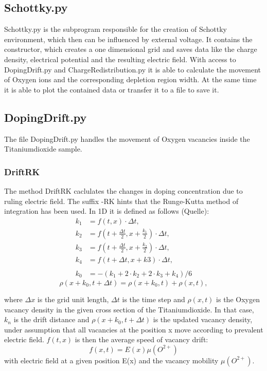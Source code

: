 \documentclass[12pt]{article}
\begin{document}
	\subsection{Schottky.py}
	Schottky.py is the subprogram responsible for the creation of Schottky environment, which then can be influenced by external voltage.
	It contains the constructor, which creates a one dimensional grid and saves data like the charge density, electrical potential and the resulting electric field. With access to DopingDrift.py and ChargeRedistribution.py it is able to calculate the movement of Oxygen ions and the corresponding depletion region width. At the same time it is able to plot the contained data or transfer it to a file to save it.

	\subsection{DopingDrift.py}
	The file DopingDrift.py handles the movement of Oxygen vacancies inside the Titaniumdioxide sample.
	
		\subsubsection{DriftRK}
		The method DriftRK caclulates the changes in doping concentration due to ruling electric field. The suffix -RK hints that the Runge-Kutta method of integration has been used. In 1D it is defined as follows (Quelle):
		\begin{align*}		
		k_1 &= f(t, x) \cdot \Delta t,																			\\
		k_2 &= f(t + \frac{\Delta t}{2}, x + \frac{k_1}{2}) \cdot \Delta t, \\
		k_3 &= f(t + \frac{\Delta t}{2}, x + \frac{k_2}{2}) \cdot \Delta t, \\
		k_4 &= f(t + \Delta t, x + k3)  \cdot \Delta t,
		\\ \\
		k_0 &= -(k_1 + 2\cdot k_2 + 2\cdot k_3 + k_4)/6
		\end{align*}
		\begin{equation}
		\label{eq:DensityDrift}
		\rho(x + k_0, t + \Delta t) = \rho(x + k_0, t) + \rho(x, t),
		\end{equation}			
		
		where $\Delta x$ is the grid unit length, $\Delta t$ is the time step and $\rho (x,t)$ is the Oxygen vacancy density in the given cross section of the Titaniumdioxide. In that case, $k_n$ is the drift distance and $\rho(x + k_0, t + \Delta t)$ is the updated vacancy density, under assumption that all vacancies at the position x move according to prevalent electric field. $f(t,x)$ is then the average speed of vacancy drift:
		\begin{equation}
		f(x,t) = E(x) \mu (O^{2+})
		\end{equation}	
		with electric field at a given position E(x) and the vacancy mobility $\mu(O^{2+})$.
		
\end{document}
